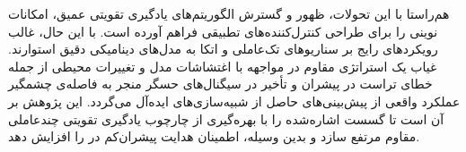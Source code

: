 هم‌راستا با این تحولات، ظهور و گسترش الگوریتم‌های یادگیری تقویتی عمیق، امکانات نوینی را برای طراحی کنترل‌کننده‌های تطبیقی فراهم آورده است. با این حال، غالب رویکردهای رایج بر سناریوهای تک‌عاملی و اتکا به مدل‌های دینامیکی دقیق استوارند. غیاب یک استراتژی مقاوم در مواجهه با اغتشاشات مدل و تغییرات محیطی از جمله خطای تراست در پیشران‌ و تأخیر در سیگنال‌های حسگر منجر به فاصله‌ی چشمگیر عملکرد واقعی از پیش‌بینی‌های حاصل از شبیه‌سازی‌های ایده‌آل می‌گردد. این پژوهش بر آن است تا گسست اشاره‌شده را با بهره‌گیری از چارچوب یادگیری تقویتی چندعاملی مقاوم مرتفع سازد و بدین وسیله، اطمینان هدایت پیشران‌کم در  را افزایش دهد.